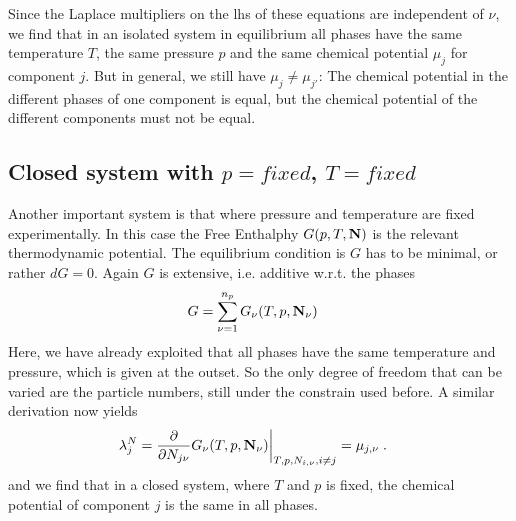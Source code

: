 Since the Laplace multipliers on the lhs of these equations are independent of $\nu$,
we find that in an isolated system in equilibrium all phases have the same temperature $T$,
the same pressure $p$ and the same chemical potential $\mu_{j}$ for component $j$. But in general, we still have  $\mu_{j}\ne \mu_{j'}$: The chemical potential in the different phases of one component is equal, but the chemical potential of the different components must not be equal.

\subsection{Closed system with $p=fixed$, $T=fixed$}

Another important system is that where pressure and temperature are fixed experimentally.
In this case the  Free Enthalphy $G(p,T,\mathbf N)$ is the relevant thermodynamic potential.
The equilibrium condition is $G$ has to be minimal, or rather $dG=0$. Again $G$ is extensive, i.e.
additive w.r.t. the phases
%
\begin{align}\label{eq:}
G &= \sum_{\nu=1}^{n_{p} } G_{\nu}(T,p,\mathbf N_{\nu})
\end{align}
%
Here, we have already exploited that all phases have the same temperature and pressure, which is given at the outset. So the only degree of freedom that can be varied are the particle numbers, still under the constrain used before. A similar derivation now yields
%
\begin{align}\label{eq:mu:condition}
\lambda^{N}_{j}&=\frac{\partial }{\partial N_{j\nu}} G_{\nu}(T,p,\mathbf N_{\nu})\bigg|_{T,p,N_{i,\nu},i\ne j} = \mu_{j,\nu}\;.
\end{align}
%
and we find that in a closed system, where $T$ and $p$ is fixed, the chemical potential of component
$j$ is the same in all phases.
